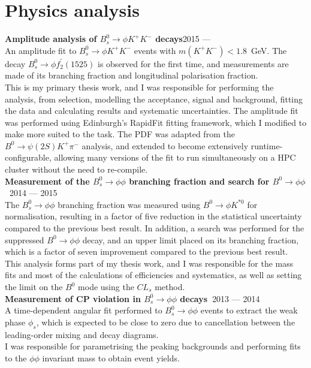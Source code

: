 \documentclass[contbibnum]{simplecv}
\newcommand\dateditem[2]{#1\hfill#2\\}
\newcommand\topictitle[3]{\dateditem{{\textbf{#1}}}{#3}#2}
\begin{document}
	\section{Physics analysis}
	\topictitle{Amplitude analysis of $B^0_s \to \phi K^{+}K^{-}$ decays}{}{2015 ---}
	An amplitude fit to ${B^0_s \to \phi K^{+}K^{-}}$ events with ${m(K^{+}K^{-})<1.8}$~GeV. The decay ${B^0_s \to \phi f_2^\prime(1525)}$ is observed for the first time, and measurements are made of its branching fraction and longitudinal polarisation fraction.
	\\[0.5em]
	This is my primary thesis work, and I was responsible for performing the analysis, from selection, modelling the acceptance, signal and background, fitting the data and calculating results and systematic uncertainties.
	The amplitude fit was performed using Edinburgh's RapidFit fitting framework, which I modified to make more suited to the task.
	The PDF was adapted from the $B^0 \to \psi(2S) K^{+} \pi^{-}$ analysis, and extended to become extensively runtime-configurable, allowing many versions of the fit to run simultaneously on a HPC cluster without the need to re-compile.
	\\[0.5em]
	\topictitle{Measurement of the $B^0_s \to \phi\phi$ branching fraction and search for $B^0 \to \phi \phi$~\textnormal{\cite{phiphiBF}}}{}{2014 --- 2015}
	The $B^0_s \to \phi\phi$ branching fraction was measured using $B^0 \to \phi K^{*0}$ for normalisation, resulting in a factor of five reduction in the statistical uncertainty compared to the previous best result.
	In addition, a search was performed for the suppressed $B^0 \to \phi\phi$ decay, and an upper limit placed on its branching fraction, which is a factor of seven improvement compared to the previous best result.
	\\[0.5em]
	This analysis forms part of my thesis work, and I was responsible for the mass fits and most of the calculations of efficiencies and systematics, as well as setting the limit on the $B^0$ mode using the $CL_s$ method.
	\\[0.5em]
	\topictitle{Measurement of CP violation in $B^0_s \to \phi\phi$ decays~\textnormal{\cite{phiphiCPV}}}{}{2013 --- 2014}
	A time-dependent angular fit performed to $B^0_s \to \phi\phi$ events to extract the weak phase $\phi_s$, which is expected to be close to zero due to cancellation between the leading-order mixing and decay diagrams.
	\\[0.5em]
	I was responsible for parametrising the peaking backgrounds and performing fits to the $\phi\phi$ invariant mass to obtain event yields.
\end{document}
